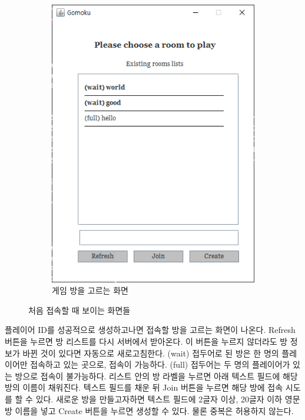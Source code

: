 \documentclass[a4paper, 10pt]{article}
\begin{document}
\begin{figure}[h]
\begin{subfigure}{.3\textwidth}
    \includegraphics[width=.9\linewidth]{resource/room_search}
    \caption{게임 방을 고르는 화면}
    \label{fig:room_search}
  \end{subfigure}
  \caption{처음 접속할 때 보이는 화면들}
\end{figure}

플레이어 ID를 성공적으로 생성하고나면 접속할 방을 고르는 화면이 나온다.
Refresh 버튼을 누르면 방 리스트를 다시 서버에서 받아온다. 이 버튼을 누르지
않더라도 방 정보가 바뀐 것이 있다면 자동으로 새로고침한다. (wait) 접두어로
된 방은 한 명의 플레이어만 접속하고 있는 곳으로, 접속이 가능하다. (full)
접두어는 두 명의 플레이어가 있는 방으로 접속이 불가능하다. 리스트 안의
방 라벨을 누르면 아래 텍스트 필드에 해당 방의 이름이 채워진다. 텍스트 필드를
채운 뒤 Join 버튼을 누르면 해당 방에 접속 시도를 할 수 있다. 새로운 방을
만들고자하면 텍스트 필드에 2글자 이상, 20글자 이하 영문 방 이름을 넣고
Create 버튼을 누르면 생성할 수 있다. 물론 중복은 허용하지 않는다.
\end{document}

